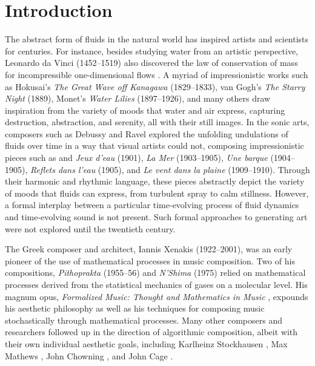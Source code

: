 \chapter{Introduction}
\label{chap:chap1}

The abstract form of fluids in the natural world has inspired artists and scientists for centuries. 
For instance, besides studying water from an artistic perspective, Leonardo da Vinci (1452--1519) also discovered the law of conservation of mass for incompressible one-dimensional flows \cite{gad1998fluid}. A myriad of impressionistic works such as Hokusai's {\em The Great Wave off Kanagawa} (1829--1833), van Gogh's {\em The Starry Night} (1889), Monet's {\em Water Lilies} (1897--1926), and many others draw inspiration from the variety of moods that water and air express, capturing destruction, abstraction, and serenity, all with their still images. In the sonic arts, composers such as Debussy and Ravel explored the unfolding undulations of fluids over time in a way that visual artists could not, composing impressionistic pieces such as and {\em Jeux d'eau} (1901), {\em La Mer}  (1903--1905), {\em Une barque} (1904--1905), {\em Reflets dans l'eau} (1905), and {\em Le vent dans la plaine} (1909--1910). Through their harmonic and rhythmic language, these pieces abstractly depict the variety of moods that fluids can express, from turbulent spray to calm stillness. However, a formal interplay between a particular time-evolving process of fluid dynamics and time-evolving sound is not present. Such formal approaches to generating art were not explored until the twentieth century.

The Greek composer and architect, Iannis Xenakis (1922--2001), was an early pioneer of the use of mathematical processes in music composition. Two of his compositions, {\em Pithoprakta} (1955--56) and {\em N'Shima} (1975) relied on mathematical processes derived from the statistical mechanics of gases on a molecular level. His magnum opus, {\em Formalized Music: Thought and Mathematics in Music} \cite{xenakis1992formalized}, expounds his aesthetic philosophy as well as his techniques for composing music stochastically through mathematical processes. Many other composers and researchers followed up in the direction of algorithmic
composition, albeit with their own individual aesthetic goals, including Karlheinz Stockhausen \cite{stockhausen1962concept}, Max Mathews \cite{mathews1963digital}, John Chowning \cite{chowning1973synthesis}, and John Cage \cite{cage2011silence}.

